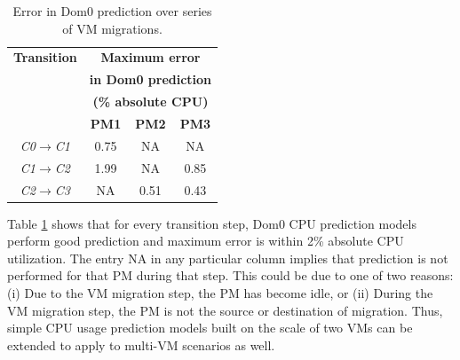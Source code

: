 \begin{table}[h]
	\centering
	\caption{Error in Dom0 prediction over series of VM migrations.}
	\begin{tabular}{ |c|c|c|c|} \hline
		\textbf{Transition} & \multicolumn{3}{|c|}{\textbf{Maximum error}} \\
		 & \multicolumn{3}{|c|}{\textbf{in Dom0 prediction}} \\
		 & \multicolumn{3}{|c|}{\textbf{(\% absolute CPU)}} \\ \cline{2-4}
		 & \textbf{PM1} & \textbf{PM2}  & \textbf{PM3} \\ \hline  %
		\textit{C0}$\rightarrow$\textit{C1} & 0.75 & NA & NA \\
		\textit{C1}$\rightarrow$\textit{C2} & 1.99 & NA & 0.85 \\
		\textit{C2}$\rightarrow$\textit{C3} & NA & 0.51 & 0.43  \\ \hline
	\end{tabular}
	\label{tab:vm-steps-error}
\end{table}



Table \ref{tab:vm-steps-error} shows that for every transition step,
Dom0 CPU prediction models perform good prediction and maximum
error is within 2\% absolute CPU utilization. The entry NA in any
particular column implies that prediction is not performed for that
PM during that step. This could be due to one of two reasons: (i) Due to
the VM migration step, the PM has become idle, or (ii) During the
VM migration step, the PM is not the source or destination of
migration.
Thus, simple CPU usage prediction models built
on the scale of two VMs can be extended to apply to multi-VM
scenarios as well.






